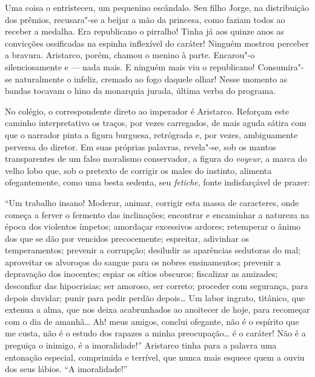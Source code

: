 \begin{hedraquote}
Uma coisa o entristeceu, um pequenino escândalo. Seu filho Jorge, na
distribuição dos prêmios, recusara"-se a beijar a mão da princesa,
como faziam todos ao receber a medalha. Era republicano o pirralho!
Tinha já aos quinze anos as convicções ossificadas na espinha
inflexível do caráter! Ninguém mostrou perceber a bravura. Aristarco,
porém, chamou o menino à parte. Encarou"-o silenciosamente e --- nada
mais. E ninguém mais viu o republicano! Consumira"-se naturalmente o
infeliz, cremado ao fogo daquele olhar! Nesse momento as bandas tocavam
o hino da monarquia jurada, última verba do programa. 
\end{hedraquote}

No colégio, o correspondente direto ao imperador é
Aristarco. Reforçam este caminho interpretativo os traços, por vezes
carregados, de mais aguda sátira com que o narrador pinta a figura
burguesa, retrógrada e, por vezes, ambiguamente perversa do diretor. Em
suas próprias palavras, revela"-se, sob os mantos transparentes de um
falso moralismo conservador, a figura do
\textit{voyeur}, a marca do velho lobo que,
sob o pretexto de corrigir os males do instinto, alimenta
ofegantemente, como uma besta sedenta, seu
\textit{fetiche}, fonte indisfarçável de
prazer: 

\begin{hedraquote}
``Um trabalho insano! Moderar, animar, corrigir esta massa de caracteres,
onde começa a ferver o fermento das inclinações; encontrar e encaminhar
a natureza na época dos violentos ímpetos; amordaçar excessivos
ardores; retemperar o ânimo dos que se dão por vencidos precocemente;
espreitar, adivinhar os temperamentos; prevenir a corrupção; desiludir
as aparências sedutoras do mal; aproveitar os alvoroços do sangue para
os nobres ensinamentos; prevenir a depravação dos inocentes; espiar os
sítios obscuros; fiscalizar as amizades; desconfiar das hipocrisias;
ser amoroso, ser correto; proceder com segurança, para depois duvidar;
punir para pedir perdão depois\ldots{} Um labor ingrato, titânico, que
extenua a alma, que nos deixa acabrunhados ao anoitecer de hoje, para
recomeçar com o dia de amanhã\ldots{} Ah! meus amigos, conclui ofegante, não
é o espírito que me custa, não é o estudo dos rapazes a minha
preocupação\ldots{} é o caráter! Não é a preguiça o inimigo, é a
imoralidade!'' Aristarco tinha para a palavra uma entonação especial,
comprimida e terrível, que nunca mais esquece quem a ouviu dos seus
lábios. ``A imoralidade!''
\end{hedraquote}

